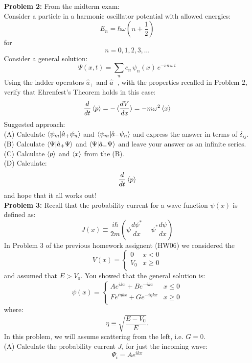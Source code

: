 \documentclass[12pt]{article}
\begin{document}
\noindent
{\bf Problem 2:} From the midterm exam:\\

\noindent
Consider a particle in a harmonic oscillator potential with allowed energies:
\begin{equation}
E_n = \hbar \omega \left( n + \frac{1}{2} \right)
\end{equation}
for
$$n=0,1,2,3,\ldots$$
Consider a general solution:
$$\Psi(x,t) = \sum_n c_n \, \psi_n(x) \, e^{-i\,n\,\omega\,t}$$
Using the ladder operators $\hat{a}_+$ and $\hat{a}_-$, with the properties recalled in Problem 2, verify that Ehrenfest's Theorem holds in this case:
$$\frac{d}{dt}\braket{p} = -\braket{\frac{dV}{dx}} = -m\omega^2 \braket{x}$$
Suggested approach:\\
(A) Calculate $\braket{\psi_m|\hat{a}_+\psi_n}$ and $\braket{\psi_m|\hat{a}_-\psi_n}$ and express the answer in terms of $\delta_{ij}$.\\[5pt]
(B) Calculate $\braket{\Psi|\hat{a}_+\Psi}$ and $\braket{\Psi|\hat{a}_-\Psi}$ and leave your answer as an infinite series.\\[5pt]
(C) Calculate $\braket{p}$ and $\braket{x}$ from the (B).\\[5pt]
(D) Calculate:
$$\frac{d}{dt}\braket{p}$$
and hope that it all works out!\\[5pt]

\noindent
{\bf Problem 3:}
Recall that the probability current for a wave function $\psi(x)$ is defined as:
$$J(x) \equiv \frac{i\hbar}{2m}\left( \psi \frac{d\psi^*}{dx} - \psi^* \frac{d\psi}{dx}\right)$$
In Problem 3 of the previous homework assignent (HW06) we considered the 
$$V(x) = \begin{cases}
0   &  x < 0 \\
V_0 &  x \geq 0 \\
\end{cases}
$$
and assumed that $E>V_0$.  You showed that the general solution is:
$$\psi(x) = \begin{cases}
A e^{\displaystyle ikx} + B e^{\displaystyle -ikx} &  x\leq0 \\
F e^{\displaystyle i\eta kx} + G e^{\displaystyle -i \eta kx} &  x\geq0 \\
\end{cases}$$
where:
$$\eta \equiv \sqrt{\frac{E-V_0}{E}}.$$
In this problem, we will assume scattering from the left, i.e. $G=0$.\\[5pt]

\noindent
(A) Calculate the probability current $J_i$ for just the incoming wave:
$$\Psi_i = A e^{ikx}$$
\end{document}

